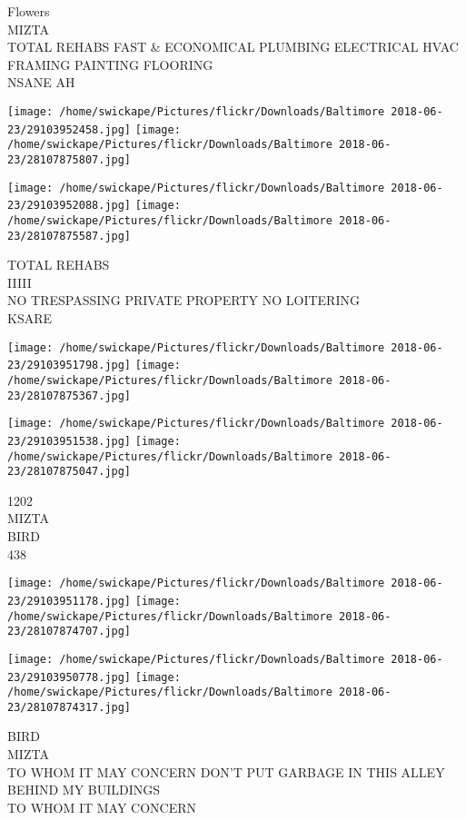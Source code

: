 \documentclass[10pt,letterpaper]{article}
\begin{document}
Flowers\\
MIZTA\\
TOTAL REHABS FAST \& ECONOMICAL PLUMBING ELECTRICAL HVAC FRAMING PAINTING FLOORING\\
NSANE AH
\pagebreak

\texttt{[image: /home/swickape/Pictures/flickr/Downloads/Baltimore 2018-06-23/29103952458.jpg]}
\texttt{[image: /home/swickape/Pictures/flickr/Downloads/Baltimore 2018-06-23/28107875807.jpg]}

\texttt{[image: /home/swickape/Pictures/flickr/Downloads/Baltimore 2018-06-23/29103952088.jpg]}
\texttt{[image: /home/swickape/Pictures/flickr/Downloads/Baltimore 2018-06-23/28107875587.jpg]}

TOTAL REHABS\\
IIIII\\
NO TRESPASSING PRIVATE PROPERTY NO LOITERING\\
KSARE
\pagebreak

\texttt{[image: /home/swickape/Pictures/flickr/Downloads/Baltimore 2018-06-23/29103951798.jpg]}
\texttt{[image: /home/swickape/Pictures/flickr/Downloads/Baltimore 2018-06-23/28107875367.jpg]}

\texttt{[image: /home/swickape/Pictures/flickr/Downloads/Baltimore 2018-06-23/29103951538.jpg]}
\texttt{[image: /home/swickape/Pictures/flickr/Downloads/Baltimore 2018-06-23/28107875047.jpg]}

1202\\
MIZTA\\
BIRD\\
438
\pagebreak

\texttt{[image: /home/swickape/Pictures/flickr/Downloads/Baltimore 2018-06-23/29103951178.jpg]}
\texttt{[image: /home/swickape/Pictures/flickr/Downloads/Baltimore 2018-06-23/28107874707.jpg]}

\texttt{[image: /home/swickape/Pictures/flickr/Downloads/Baltimore 2018-06-23/29103950778.jpg]}
\texttt{[image: /home/swickape/Pictures/flickr/Downloads/Baltimore 2018-06-23/28107874317.jpg]}

BIRD\\
MIZTA\\
TO WHOM IT MAY CONCERN DON'T PUT GARBAGE IN THIS ALLEY BEHIND MY BUILDINGS\\
TO WHOM IT MAY CONCERN
\pagebreak
\end{document}
